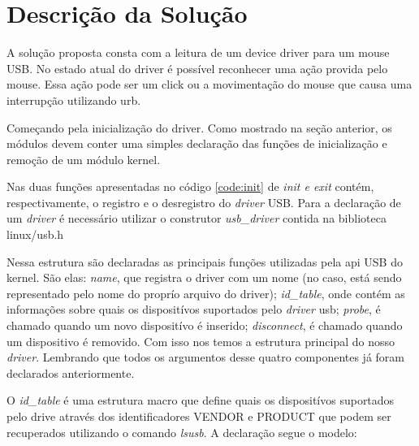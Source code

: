 \section{Descrição da Solução}

A solução proposta consta com a leitura de um device driver para um mouse USB.
No estado atual do driver é possível reconhecer uma ação provida pelo mouse.
Essa ação pode ser um click ou a movimentação do mouse que causa uma interrupção
utilizando urb.

Começando pela inicialização do driver. Como mostrado na seção anterior, os módulos
devem conter uma simples declaração das funções de inicialização e remoção de um
módulo kernel. 

\lstset{style=shell}


Nas duas funções apresentadas no código \ref{code:init} de \textit{init e exit} contém, respectivamente,
o registro e o desregistro do \textit{driver} USB. Para a declaração de um \textit{driver} é necessário utilizar
o construtor \textit{usb\_driver} contida na biblioteca linux/usb.h

\lstset{style=shell}


Nessa estrutura são declaradas as principais funções utilizadas pela api USB do kernel. São elas:
\textit{name}, que registra o driver com um nome (no caso, está sendo representado pelo nome do proprío
arquivo do driver); \textit{id\_table}, onde contém as informações sobre quais os dispositívos suportados
pelo \textit{driver} usb; \textit{probe}, é chamado quando um novo dispositívo é inserido; \textit{disconnect}, é chamado
quando um dispositivo é removido. Com isso nos temos a estrutura principal do nosso \textit{driver}.
Lembrando que todos os argumentos desse quatro componentes já foram declarados anteriormente.

O \textit{id\_table} é uma estrutura macro que define quais os dispositívos suportados pelo drive
através dos identificadores VENDOR e PRODUCT que podem ser recuperados utilizando o comando
\textit{lsusb}. A declaração segue o modelo:

\lstset{style=shell}


